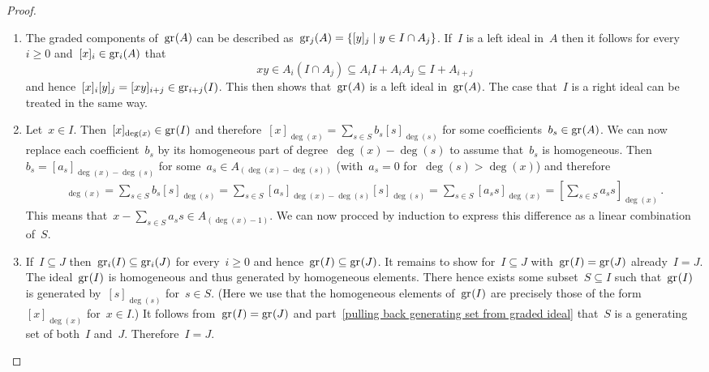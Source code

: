 \begin{proof}
  \leavevmode
  \begin{enumerate}
    \item
      The graded components of~$\gr(A)$ can be described as~$\gr[j](A) = \{ [y]_j \suchthat y \in I \cap A_j \}$.
      If~$I$ is a left ideal in~$A$ then it follows for every~$i \geq 0$ and~$[x]_i \in \gr[i](A)$ that
      \[
        xy
        \in
        A_i (I \cap A_j)
        \subseteq
        A_i I + A_i A_j
        \subseteq
        I + A_{i+j}
      \]
      and hence~$[x]_i [y]_j = [xy]_{i+j} \in \gr[i+j](I)$.
      This then shows that~$\gr(A)$ is a left ideal in~$\gr(A)$.
      The case that~$I$ is a right ideal can be treated in the same way.
    \item
      Let~$x \in I$.
      Then~$[x]_{\deg(x)} \in \gr(I)$ and therefore~$[x]_{\deg(x)} = \sum_{s \in S} b_s [s]_{\deg(s)}$ for some coefficients~$b_s \in \gr(A)$.
      We can now replace each coefficient~$b_s$ by its homogeneous part of degree~$\deg(x) - \deg(s)$ to assume that~$b_s$ is homogeneous.
      Then~$b_s = [a_s]_{\deg(x)-\deg(s)}$ for some~$a_s \in A_{(\deg(x)-\deg(s))}$ (with~$a_s = 0$ for~$\deg(s) > \deg(x)$) and therefore
      \begin{align*}
        [x]_{\deg(x)}
        =
        \sum_{s \in S} b_s [s]_{\deg(s)}
        =
        \sum_{s \in S} [a_s]_{\deg(x) - \deg(s)} [s]_{\deg(s)}
        =
        \sum_{s \in S} [a_s s]_{\deg(x)}
        =
        \left[ \sum_{s \in S} a_s s \right]_{\deg(x)} \,.
      \end{align*}
      This means that~$x - \sum_{s \in S} a_s s \in A_{(\deg(x)-1)}$.
      We can now procced by induction to express this difference as a linear combination of~$S$.
    \item
      If~$I \subseteq J$ then~$\gr[i](I) \subseteq \gr[i](J)$ for every~$i \geq 0$ and hence~$\gr(I) \subseteq \gr(J)$.
      It remains to show for~$I \subseteq J$ with~$\gr(I) = \gr(J)$ already~$I = J$.
      The ideal~$\gr(I)$ is homogeneous and thus generated by homogeneous elements.
      There hence exists some subset~$S \subseteq I$ such that~$\gr(I)$ is generated by~$[s]_{\deg(s)}$ for~$s \in S$.
      (Here we use that the homogeneous elements of~$\gr(I)$ are precisely those of the form~$[x]_{\deg(x)}$ for~$x \in I$.)
      It follows from~$\gr(I) = \gr(J)$ and part~\ref*{pulling back generating set from graded ideal} that~$S$ is a generating set of both~$I$ and~$J$.
      Therefore~$I = J$.
    \qedhere
  \end{enumerate}
\end{proof}


